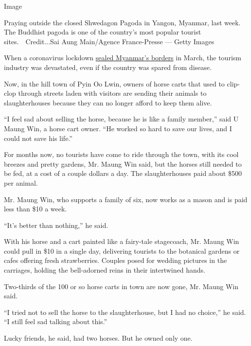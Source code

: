 Image

Praying outside the closed Shwedagon Pagoda in Yangon, Myanmar, last
week. The Buddhist pagoda is one of the country's most popular tourist
sites.~~Credit...Sai Aung Main/Agence France-Presse --- Getty Images

When a coronavirus lockdown
\href{https://www.nytimes.com/2020/03/27/world/asia/coronavirus-myanmar-jobs-china.html?searchResultPosition=7}{sealed
Myanmar's borders} in March, the tourism industry was devastated, even
if the country was spared from disease.

Now, in the hill town of Pyin Oo Lwin, owners of horse carts that used
to clip-clop through streets laden with visitors are sending their
animals to slaughterhouses because they can no longer afford to keep
them alive.

``I feel sad about selling the horse, because he is like a family
member,'' said U Maung Win, a horse cart owner. ``He worked so hard to
save our lives, and I could not save his life.''

For months now, no tourists have come to ride through the town, with its
cool breezes and pretty gardens, Mr. Maung Win said, but the horses
still needed to be fed, at a cost of a couple dollars a day. The
slaughterhouses paid about \$500 per animal.

Mr. Maung Win, who supports a family of six, now works as a mason and is
paid less than \$10 a week.

``It's better than nothing,'' he said.

With his horse and a cart painted like a fairy-tale stagecoach, Mr.
Maung Win could pull in \$10 in a single day, delivering tourists to the
botanical gardens or cafes offering fresh strawberries. Couples posed
for wedding pictures in the carriages, holding the bell-adorned reins in
their intertwined hands.

Two-thirds of the 100 or so horse carts in town are now gone, Mr. Maung
Win said.

``I tried not to sell the horse to the slaughterhouse, but I had no
choice,'' he said. ``I still feel sad talking about this.''

Lucky friends, he said, had two horses. But he owned only one.

\hypertarget{section-8}{%
\subsection{}\label{section-8}}


